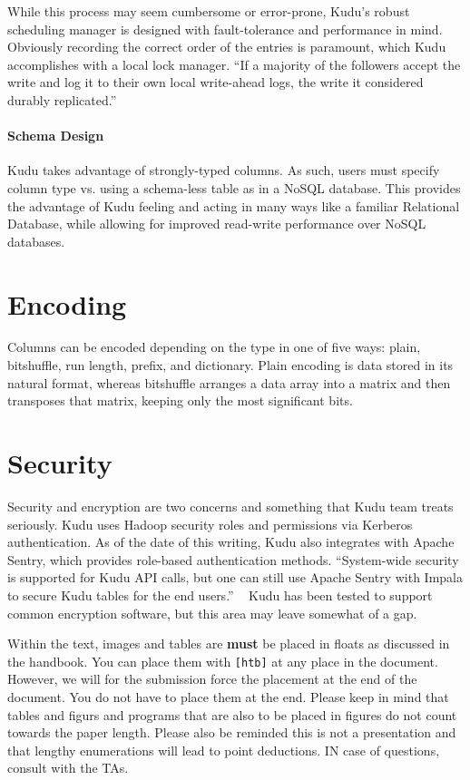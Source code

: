 While this process may seem cumbersome or error-prone, Kudu's robust
scheduling manager is designed with fault-tolerance and performance
in mind. Obviously recording the correct order of the entries is
paramount, which Kudu accomplishes with a local lock manager.  ``If a
majority of the followers accept the write and log it to their own
local write-ahead logs, the write it considered durably replicated.'' ~\cite{hid-sp18-407-kudu-intro}

\paragraph{Schema Design} 
Kudu takes advantage of strongly-typed columns. As such, users must specify column type vs. using a schema-less table as in a NoSQL database.  This provides the advantage of Kudu feeling and acting in many ways like a familiar Relational Database, while allowing for improved read-write performance over NoSQL databases. ~\cite{hid-sp18-407-kudu-schema-design}

\section{Encoding} 
Columns can be encoded depending on the type in one of five ways: plain, bitshuffle, run length, prefix, and dictionary. Plain encoding is data stored in its natural format, whereas bitshuffle arranges a data array into a matrix and then transposes that matrix, keeping only the most significant bits. ~\cite{hid-sp18-407-bitshuffle}

\section{Security} 
Security and encryption are two concerns and something that Kudu team treats seriously. Kudu uses Hadoop security roles and permissions via Kerberos authentication. As of the date of this writing, Kudu also integrates with Apache Sentry, which provides role-based authentication methods.  ``System-wide security is supported for Kudu API calls, but one can still use Apache Sentry with Impala to secure Kudu tables for the end users.'' ~\cite{hid-sp18-407-benchmarking-kudu} Kudu has been tested to support common encryption software, but this area may leave somewhat of a gap. 






Within the text, images and tables are {\bf must} be placed in floats
as discussed in the handbook. You can place them with \verb|[htb]| at
any place in the document. However, we will for the submission force
the placement at the end of the document. You do not have to place
them at the end. Please keep in mind that tables and figurs and
programs that are also to be placed in figures do not count towards
the paper length. Please also be reminded this is not a presentation
and that lengthy enumerations will lead to point deductions. IN case
of questions, consult with the TAs.

